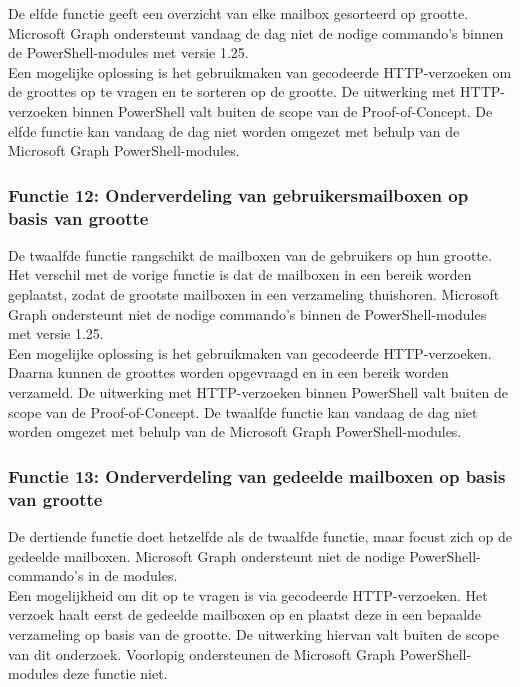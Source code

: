 De elfde functie geeft een overzicht van elke mailbox gesorteerd op grootte. Microsoft Graph ondersteunt vandaag de dag niet de nodige commando's binnen de PowerShell-modules met versie 1.25. \\ 

Een mogelijke oplossing is het gebruikmaken van gecodeerde \ac{HTTP}-verzoeken om de groottes op te vragen en te sorteren op de grootte. De uitwerking met \ac{HTTP}-verzoeken binnen PowerShell valt buiten de scope van de Proof-of-Concept. De elfde functie kan vandaag de dag niet worden omgezet met behulp van de Microsoft Graph PowerShell-modules.

\subsubsection{Functie 12: Onderverdeling van gebruikersmailboxen op basis van grootte}


De twaalfde functie rangschikt de mailboxen van de gebruikers op hun grootte. Het verschil met de vorige functie is dat de mailboxen in een bereik worden geplaatst, zodat de grootste mailboxen in een verzameling thuishoren. Microsoft Graph ondersteunt niet de nodige commando's binnen de PowerShell-modules met versie 1.25. \\ 

Een mogelijke oplossing is het gebruikmaken van gecodeerde \ac{HTTP}-verzoeken. Daarna kunnen de groottes worden opgevraagd en in een bereik worden verzameld. De uitwerking met \ac{HTTP}-verzoeken binnen PowerShell valt buiten de scope van de Proof-of-Concept. De twaalfde functie kan vandaag de dag niet worden omgezet met behulp van de Microsoft Graph PowerShell-modules.

\subsubsection{Functie 13: Onderverdeling van gedeelde mailboxen op basis van grootte}


De dertiende functie doet hetzelfde als de twaalfde functie, maar focust zich op de gedeelde mailboxen. Microsoft Graph ondersteunt niet de nodige PowerShell-commando's in de modules. \\

Een mogelijkheid om dit op te vragen is via gecodeerde \ac{HTTP}-verzoeken. Het verzoek haalt eerst de gedeelde mailboxen op en plaatst deze in een bepaalde verzameling op basis van de grootte. De uitwerking hiervan valt buiten de scope van dit onderzoek. Voorlopig ondersteunen de Microsoft Graph PowerShell-modules deze functie niet.

